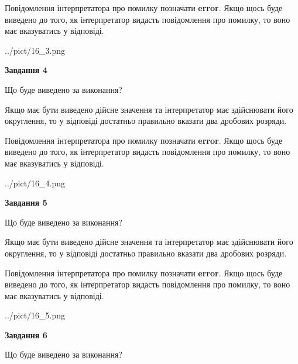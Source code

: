 \documentclass[12pt, ukrainian]{article}
\begin{document}
{\begin {Large}
Повідомлення інтерпретатора про помилку позначати \textbf{error}.
Якщо щось буде виведено до того, як інтерпретатор видасть повідомлення про помилку, 
то воно має вказуватись у відповіді. \par

\begin{center}
	{../pict/16_3.png}
\end{center}
\newpage

{\begin {center}\textbf{Завдання 4}\end {center}}\par
Що буде виведено за виконання? \par

Якщо має бути виведено дійсне значення та інтерпретатор має здійснювати його округлення, 
то у відповіді достатньо правильно вказати два дробових розряди.

Повідомлення інтерпретатора про помилку позначати \textbf{error}.
Якщо щось буде виведено до того, як інтерпретатор видасть повідомлення про помилку, 
то воно має вказуватись у відповіді. \par

\begin{center}
	{../pict/16_4.png}
\end{center}
\newpage

{\begin {center}\textbf{Завдання 5}\end {center}}\par
Що буде виведено за виконання? \par

Якщо має бути виведено дійсне значення та інтерпретатор має здійснювати його округлення, 
то у відповіді достатньо правильно вказати два дробових розряди.

Повідомлення інтерпретатора про помилку позначати \textbf{error}.
Якщо щось буде виведено до того, як інтерпретатор видасть повідомлення про помилку, 
то воно має вказуватись у відповіді. \par

\begin{center}
	{../pict/16_5.png}
\end{center}
\newpage

{\begin {center}\textbf{Завдання 6}\end {center}}\par
Що буде виведено за виконання? \par


\end{Large}}
\end{document}
